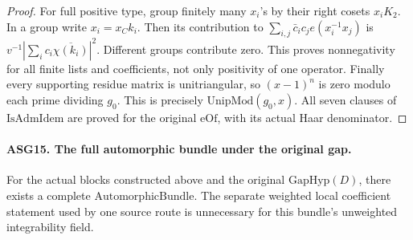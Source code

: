 \begin{proof}
For full positive type, group finitely many \(x_i\)'s by their
right cosets \(x_iK_2\).  In a group write \(x_i=x_C k_i\).
Then its contribution to
\(\sum_{i,j}\bar c_i c_j e(x_i^{-1}x_j)\) is
\(v^{-1}|\sum_i c_i\overline{\chi(k_i)}|^2\).
Different groups contribute zero.  This proves nonnegativity for all
finite lists and coefficients, not only positivity of one operator.
Finally every supporting residue matrix is unitriangular, so
\((x-1)^n\) is zero modulo each prime dividing \(g_0\).
This is precisely \(\mathrm{UnipMod}(g_0,x)\).
All seven clauses of \(\mathrm{IsAdmIdem}\) are proved for the
original \(\mathrm{eOf}\), with its actual Haar denominator.
\end{proof}

\paragraph{ASG15. The full automorphic bundle under the original gap.}
\label{claim:ASG15}
For the actual blocks constructed above and the original
\(\mathrm{GapHyp}(D)\), there exists a complete
\(\mathrm{AutomorphicBundle}\).  The separate weighted local
coefficient statement used by one source route is unnecessary for
this bundle's unweighted integrability field.
